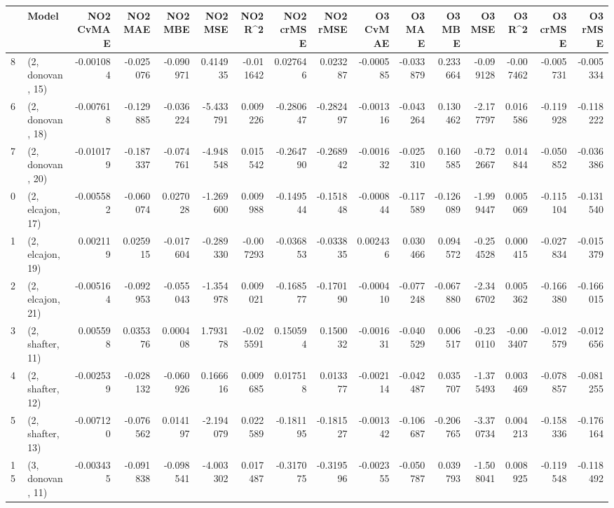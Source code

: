 \begin{tabular}{llrrrrrrrrrrrrrr}
\toprule
{} &             Model &  NO2 CvMAE &   NO2 MAE &   NO2 MBE &    NO2 MSE &   NO2 R\textasciicircum2 &  NO2 crMSE &  NO2 rMSE &  O3 CvMAE &    O3 MAE &    O3 MBE &     O3 MSE &    O3 R\textasciicircum2 &  O3 crMSE &   O3 rMSE \\
\midrule
8  &  (2, donovan, 15) &  -0.001084 & -0.025076 & -0.090971 &   0.414935 & -0.011642 &   0.027646 &  0.023287 & -0.000585 & -0.033879 &  0.233664 &  -0.099128 & -0.007462 & -0.005731 & -0.005334 \\
6  &  (2, donovan, 18) &  -0.007618 & -0.129885 & -0.036224 &  -5.433791 &  0.009226 &  -0.280647 & -0.282497 & -0.001316 & -0.043264 &  0.130462 &  -2.177797 &  0.016586 & -0.119928 & -0.118222 \\
7  &  (2, donovan, 20) &  -0.010179 & -0.187337 & -0.074761 &  -4.948548 &  0.015542 &  -0.264790 & -0.268942 & -0.001632 & -0.025310 &  0.160585 &  -0.722667 &  0.014844 & -0.050852 & -0.036386 \\
0  &  (2, elcajon, 17) &  -0.005582 & -0.060074 &  0.027028 &  -1.269600 &  0.009988 &  -0.149544 & -0.151848 & -0.000844 & -0.117589 & -0.126089 &  -1.999447 &  0.005069 & -0.115104 & -0.131540 \\
1  &  (2, elcajon, 19) &   0.002119 &  0.025915 & -0.017604 &  -0.289330 & -0.007293 &  -0.036853 & -0.033835 &  0.002436 &  0.030466 &  0.094572 &  -0.254528 &  0.000415 & -0.027834 & -0.015379 \\
2  &  (2, elcajon, 21) &  -0.005164 & -0.092953 & -0.055043 &  -1.354978 &  0.009021 &  -0.168577 & -0.170190 & -0.000410 & -0.077248 & -0.067880 &  -2.346702 &  0.005362 & -0.166380 & -0.166015 \\
3  &  (2, shafter, 11) &   0.005598 &  0.035376 &  0.000408 &   1.793178 & -0.025591 &   0.150594 &  0.150032 & -0.001631 & -0.040529 &  0.006517 &  -0.230110 & -0.003407 & -0.012579 & -0.012656 \\
4  &  (2, shafter, 12) &  -0.002539 & -0.028132 & -0.060926 &   0.166616 &  0.009685 &   0.017518 &  0.013377 & -0.002114 & -0.042487 &  0.035707 &  -1.375493 &  0.003469 & -0.078857 & -0.081255 \\
5  &  (2, shafter, 13) &  -0.007120 & -0.076562 &  0.014197 &  -2.194079 &  0.022589 &  -0.181195 & -0.181527 & -0.001342 & -0.106687 & -0.206765 &  -3.370734 &  0.004213 & -0.158336 & -0.176164 \\
15 &  (3, donovan, 11) &  -0.003435 & -0.091838 & -0.098541 &  -4.003302 &  0.017487 &  -0.317075 & -0.319596 & -0.002355 & -0.050787 &  0.039793 &  -1.508041 &  0.008925 & -0.119548 & -0.118492 \\

\end{tabular}

